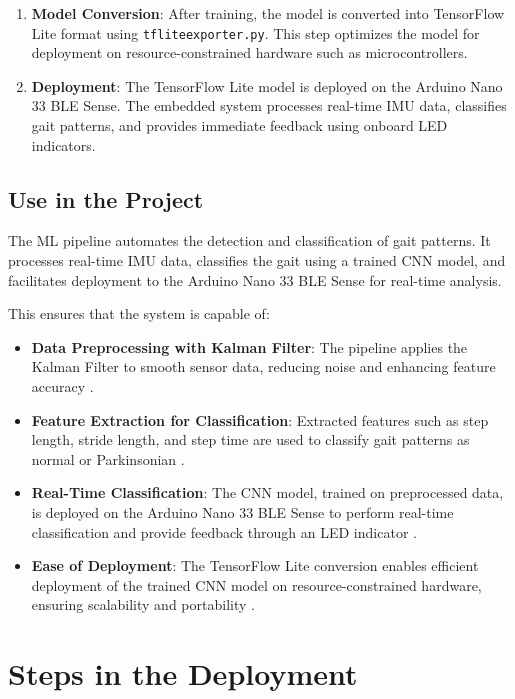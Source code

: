 \begin{enumerate}
    \item \textbf{Model Conversion}: After training, the model is converted into TensorFlow Lite format using \texttt{tfliteexporter.py}. This step optimizes the model for deployment on resource-constrained hardware such as microcontrollers\cite{David:2021}.
    
    \item \textbf{Deployment}: The TensorFlow Lite model is deployed on the Arduino Nano 33 BLE Sense. The embedded system processes real-time IMU data, classifies gait patterns, and provides immediate feedback using onboard LED indicators\cite{ArduinoNano33Sense2025}.
\end{enumerate}


\newpage
\subsection{Use in the Project}
The ML pipeline automates the detection and classification of gait patterns. It processes real-time IMU data, classifies the gait using a trained CNN model, and facilitates deployment to the Arduino Nano 33 BLE Sense for real-time analysis.

This ensures that the system is capable of:
\begin{itemize}
    \item \textbf{Data Preprocessing with Kalman Filter}: The pipeline applies the Kalman Filter to smooth sensor data, reducing noise and enhancing feature accuracy \cite{Kalman:2012}.
    \item \textbf{Feature Extraction for Classification}: Extracted features such as step length, stride length, and step time are used to classify gait patterns as normal or Parkinsonian \cite{Panebianco:2018}.
    \item \textbf{Real-Time Classification}: The CNN model, trained on preprocessed data, is deployed on the Arduino Nano 33 BLE Sense to perform real-time classification and provide feedback through an LED indicator \cite{ZhangWenwen:2022}.
    \item \textbf{Ease of Deployment}: The TensorFlow Lite conversion enables efficient deployment of the trained CNN model on resource-constrained hardware, ensuring scalability and portability \cite{Sulaimon:2021}.
\end{itemize}





\section{Steps in the Deployment}

